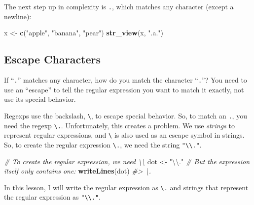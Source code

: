 \documentclass[
]{book}
\newenvironment{Shaded}{\begin{snugshade}}{\end{snugshade}}
\newcommand{\CharTok}[1]{\textcolor[rgb]{0.31,0.60,0.02}{#1}}
\newcommand{\CommentTok}[1]{\textcolor[rgb]{0.56,0.35,0.01}{\textit{#1}}}
\newcommand{\KeywordTok}[1]{\textcolor[rgb]{0.13,0.29,0.53}{\textbf{#1}}}
\newcommand{\NormalTok}[1]{#1}
\newcommand{\StringTok}[1]{\textcolor[rgb]{0.31,0.60,0.02}{#1}}
\begin{document}
\hypertarget{htmlwidget-ac96cb3ee4656e2e9ec3}{}

The next step up in complexity is \texttt{.}, which matches any character (except a newline):

\begin{Shaded}
\begin{Highlighting}[]
\NormalTok{x <-}\StringTok{ }\KeywordTok{c}\NormalTok{(}\StringTok{"apple"}\NormalTok{, }\StringTok{"banana"}\NormalTok{, }\StringTok{"pear"}\NormalTok{)}
\KeywordTok{str_view}\NormalTok{(x, }\StringTok{".a."}\NormalTok{)}
\end{Highlighting}
\end{Shaded}

\hypertarget{htmlwidget-e5c8c404fe174e4c81bd}{}

\hypertarget{escape-characters}{%
\subsection{Escape Characters}\label{escape-characters}}

If ``\texttt{.}'' matches any character, how do you match the character ``\texttt{.}''? You need to use an ``escape'' to tell the regular expression you want to match it exactly, not use its special behavior.

Regexps use the backslash, \texttt{\textbackslash{}}, to escape special behavior. So, to match an \texttt{.}, you need the regexp \texttt{\textbackslash{}.}. Unfortunately, this creates a problem. We use \emph{strings} to represent regular expressions, and \texttt{\textbackslash{}} is also used as an escape symbol in strings. So, to create the regular expression \texttt{\textbackslash{}.}, we need the string \texttt{"\textbackslash{}\textbackslash{}."}.

\begin{Shaded}
\begin{Highlighting}[]
\CommentTok{# To create the regular expression, we need \textbackslash{}\textbackslash{}}
\NormalTok{dot <-}\StringTok{ "}\CharTok{\textbackslash{}\textbackslash{}}\StringTok{."}
\CommentTok{# But the expression itself only contains one:}
\KeywordTok{writeLines}\NormalTok{(dot)}
\CommentTok{#> \textbackslash{}.}
\end{Highlighting}
\end{Shaded}

In this lesson, I will write the regular expression as \texttt{\textbackslash{}.} and strings that represent the regular expression as \texttt{"\textbackslash{}\textbackslash{}."}.
\end{document}
